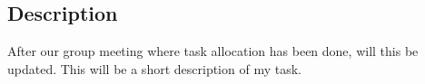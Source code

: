 
\subsection{Description}
 After our group meeting where task allocation has been done, will this be updated. This will be a short description of my task.